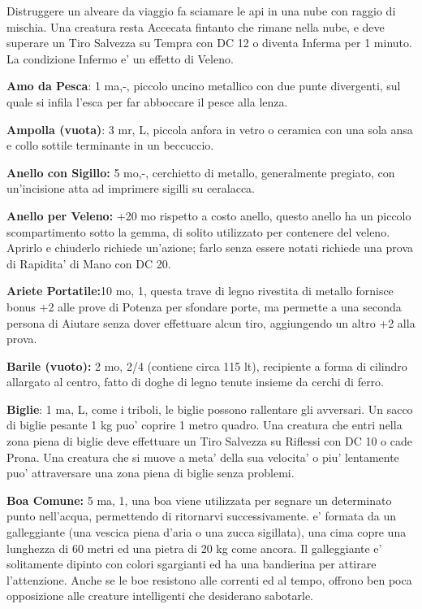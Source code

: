 \documentclass[a4paper,11pt,twoside,openany]{book}
\begin{document}
{		Distruggere un alveare da viaggio fa sciamare le api in una nube con raggio di mischia. Una creatura resta Accecata fintanto che rimane nella nube, e deve superare un Tiro Salvezza su Tempra con DC 12 o diventa Inferma per 1 minuto. La condizione Infermo e' un effetto di Veleno.
		
		\textbf{Amo da Pesca}: 1 ma,-, piccolo uncino metallico con due punte divergenti, sul quale si infila l'esca per far abboccare il pesce alla lenza.
		
		\textbf{Ampolla (vuota)}: 3 mr, L, piccola anfora in vetro o ceramica con una sola ansa e collo sottile terminante in un beccuccio.
		
		\textbf{Anello con Sigillo:} 5 mo,-, cerchietto di metallo, generalmente pregiato, con un'incisione atta ad imprimere sigilli su ceralacca. 
		
		\textbf{Anello per Veleno:} +20 mo rispetto a costo anello, questo anello ha un piccolo scompartimento sotto la gemma, di solito utilizzato per contenere del veleno. Aprirlo e chiuderlo richiede un'azione; farlo senza essere notati richiede una prova di Rapidita' di Mano con DC 20.
		
		\textbf{Ariete Portatile:}10 mo, 1, questa trave di legno rivestita di metallo fornisce bonus +2 alle prove di Potenza per sfondare porte, ma permette a una seconda persona di Aiutare senza dover effettuare alcun tiro, aggiungendo un altro +2 alla prova.
		
		\textbf{Barile (vuoto):} 2 mo, 2/4 (contiene circa 115 lt), recipiente a forma di cilindro allargato al centro, fatto di doghe di legno tenute insieme da cerchi di ferro.
		
		\textbf{Biglie}: 1 ma, L, come i triboli, le biglie possono rallentare gli avversari. Un sacco di biglie pesante 1 kg puo' coprire 1 metro quadro. Una creatura che entri nella zona piena di biglie deve effettuare un Tiro Salvezza su Riflessi con DC 10 o cade Prona. Una creatura che si muove a meta' della sua velocita' o piu' lentamente puo' attraversare una zona piena di biglie senza problemi.
		
		\textbf{Boa Comune:} 5 ma, 1, una boa viene utilizzata per segnare un determinato punto nell'acqua, permettendo di ritornarvi successivamente. e' formata da un galleggiante (una vescica piena d'aria o una zucca sigillata), una cima copre una lunghezza di 60 metri ed una pietra di 20 kg come ancora. Il galleggiante e' solitamente dipinto con colori sgargianti ed ha una bandierina per attirare l'attenzione. Anche se le boe resistono alle correnti ed al tempo, offrono ben poca opposizione alle creature intelligenti che desiderano sabotarle.
		
}
\end{document}

